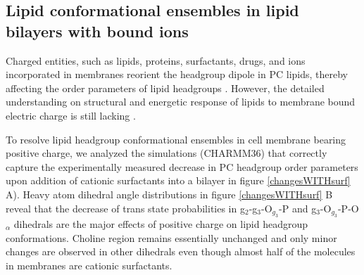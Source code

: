 \documentclass[aps,prl,superscriptaddress,twocolumn]{revtex4}
\begin{document}
\subsection{Lipid conformational ensembles in lipid bilayers with bound ions}

Charged entities, such as lipids, proteins, surfactants, drugs, and ions incorporated in membranes reorient the headgroup dipole in PC lipids, thereby affecting the order parameters of lipid headgroups \cite{seelig87}. However, the detailed understanding on structural and energetic response of lipids to membrane bound electric charge is still lacking \cite{Semchyschyn04}.

To resolve lipid headgroup conformational ensembles in cell membrane bearing positive charge, we analyzed the simulations (CHARMM36) that correctly capture the experimentally measured decrease in PC headgroup order parameters upon addition of cationic surfactants into a bilayer in figure \ref{changesWITHsurf} A). Heavy atom dihedral angle distributions in figure \ref{changesWITHsurf} B reveal that the decrease of trans state probabilities in g$_2$-g$_3$-O$_{g_3}$-P and g$_3$-O$_{g_3}$-P-O$_\alpha$
dihedrals are the major effects of positive charge on lipid headgroup conformations. Choline region remains essentially unchanged and only minor changes are observed in other dihedrals even though almost half of the molecules in membranes are cationic surfactants. 
\end{document}
